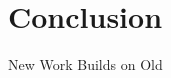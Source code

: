 \documentclass[slidestop,aspectratio=169]{beamer}
\theoremstyle{plain}
\theoremstyle{definition}
\theoremstyle{remark}
\begin{document}

\section{Conclusion}
\begin{frame}[t]{New Work Builds on Old}
\newcommand{\cdone}{green!10}
\newcommand{\cwip}{yellow!30}
\newcommand{\cprop}{orange!30}


\end{frame}
\end{document}
